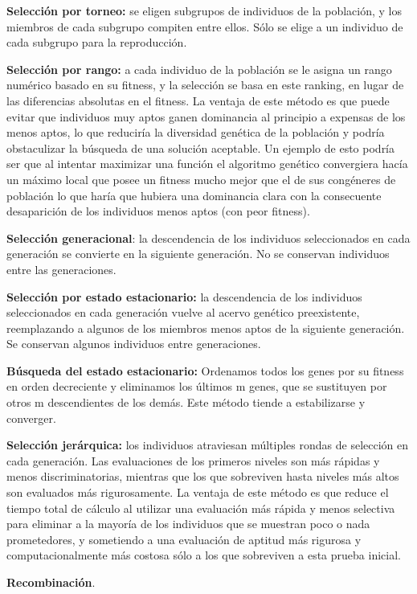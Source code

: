 \documentclass[
  a4paper,
  DIV=11,
  numbers=noendperiod]{scrreprt}
\begin{document}
\textbf{Selección por torneo:} se eligen subgrupos de individuos de la
población, y los miembros de cada subgrupo compiten entre ellos. Sólo se
elige a un individuo de cada subgrupo para la reproducción.

\textbf{Selección por rango:} a cada individuo de la población se le
asigna un rango numérico basado en su fitness, y la selección se basa en
este ranking, en lugar de las diferencias absolutas en el fitness. La
ventaja de este método es que puede evitar que individuos muy aptos
ganen dominancia al principio a expensas de los menos aptos, lo que
reduciría la diversidad genética de la población y podría obstaculizar
la búsqueda de una solución aceptable. Un ejemplo de esto podría ser que
al intentar maximizar una función el algoritmo genético convergiera
hacía un máximo local que posee un fitness mucho mejor que el de sus
congéneres de población lo que haría que hubiera una dominancia clara
con la consecuente desaparición de los individuos menos aptos (con peor
fitness).

\textbf{Selección generacional}: la descendencia de los individuos
seleccionados en cada generación se convierte en la siguiente
generación. No se conservan individuos entre las generaciones.

\textbf{Selección por estado estacionario:} la descendencia de los
individuos seleccionados en cada generación vuelve al acervo genético
preexistente, reemplazando a algunos de los miembros menos aptos de la
siguiente generación. Se conservan algunos individuos entre
generaciones.

\textbf{Búsqueda del estado estacionario:} Ordenamos todos los genes por
su fitness en orden decreciente y eliminamos los últimos m genes, que se
sustituyen por otros m descendientes de los demás. Este método tiende a
estabilizarse y converger.

\textbf{Selección jerárquica:} los individuos atraviesan múltiples
rondas de selección en cada generación. Las evaluaciones de los primeros
niveles son más rápidas y menos discriminatorias, mientras que los que
sobreviven hasta niveles más altos son evaluados más rigurosamente. La
ventaja de este método es que reduce el tiempo total de cálculo al
utilizar una evaluación más rápida y menos selectiva para eliminar a la
mayoría de los individuos que se muestran poco o nada prometedores, y
sometiendo a una evaluación de aptitud más rigurosa y computacionalmente
más costosa sólo a los que sobreviven a esta prueba inicial.

\textbf{Recombinación}.
\end{document}
